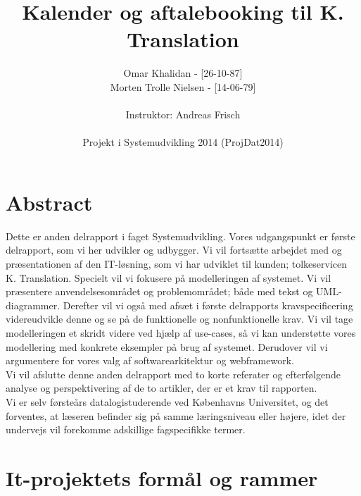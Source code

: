 \documentclass[12pt]{article}   %
\title{Kalender og aftalebooking til K. Translation}
\author{Omar Khalidan - [26-10-87]\\
     Morten Trolle Nielsen - [14-06-79]\\ \\
    Instruktor: Andreas Frisch\\ \\
Projekt i Systemudvikling 2014 (ProjDat2014)}
\begin{document}
\maketitle
\thispagestyle{empty}
\newpage
\tableofcontents
\newpage

\section{Abstract}
Dette er anden delrapport i faget Systemudvikling. Vores udgangspunkt er første
delrapport, som vi her udvikler og udbygger. Vi vil fortsætte arbejdet med og
præsentationen af den IT-løsning, som vi har udviklet til kunden; tolkeservicen
K. Translation. Specielt vil vi fokusere på modelleringen af systemet. Vi vil 
præsentere anvendelsesområdet og problemområdet; både med tekst og UML-diagrammer.
Derefter vil vi også med afsæt i første delrapports kravspecificering videreudvikle
denne og se på de funktionelle og nonfunktionelle krav. Vi vil tage modelleringen
et skridt videre ved hjælp af use-cases, så vi kan understøtte vores modellering med
konkrete eksempler på brug af systemet. Derudover vil vi argumentere for vores
valg af softwarearkitektur og webframework. \\
Vi vil afslutte denne anden delrapport med to korte referater og efterfølgende
analyse og perspektivering af de to artikler, der er et krav til rapporten.\\
Vi er selv førsteårs datalogistuderende ved Københavns Universitet, og det
forventes, at læseren befinder sig på samme læringsniveau eller højere, idet
der undervejs vil forekomme adskillige fagspecifikke termer. 

\newpage

\section{It-projektets formål og rammer}
\end{document}
